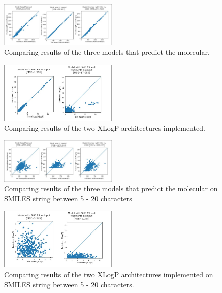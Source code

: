    \begin{figure}
        \centering
        \includegraphics[width=0.5\textwidth]{figures/graphs-Mol-Wei_Comp1.jpg}
        \caption{Comparing results of the three models that predict the molecular.}
        \label{fig:comparison_mol_weight}
    \end{figure}
    \begin{figure}
        \centering
        \includegraphics[width=0.5\textwidth]{figures/graphs-XLog_Comp1.jpg}
        \caption{Comparing results of the two XLogP architectures implemented.}
        \label{fig:comparison_xlogp}
    \end{figure}
    \begin{figure}
        \centering
        \includegraphics[width=0.5\textwidth]{figures/graphs-Mol-Wei_Comp2.jpg}
        \caption{Comparing results of the three models that predict the molecular on SMILES string between 5 - 20 characters}
        \label{fig:comparison_mol_weight1}
    \end{figure}
    \begin{figure}
        \centering
        \includegraphics[width=0.5\textwidth]{figures/graphs-XLog_Comp2.jpg}
        \caption{Comparing results of the two XLogP architectures implemented on SMILES string between 5 - 20 characters.}
        \label{fig:comparison_xlogp1}
    \end{figure}